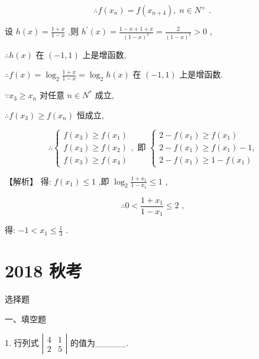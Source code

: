 \documentclass[10pt]{article}
\begin{document}
\[
\therefore f\left( {x}_{n}\right)  = f\left( {x}_{n + 4}\right) ,\;n \in  {N}^{ + }\text{ . }
\]

设 \(h\left( x\right)  = \frac{1 + x}{1 - x}\) ,则 \({h}^{\prime }\left( x\right)  = \frac{1 - x + 1 + x}{{\left( 1 - x\right) }^{2}} = \frac{2}{{\left( 1 - x\right) }^{2}} > 0\) ,

\(\therefore h\left( x\right)\) 在 \(\left( {-1,1}\right)\) 上是增函数,

\(\therefore f\left( x\right)  = {\log }_{2}\frac{1 + x}{1 - x} = {\log }_{2}h\left( x\right)\) 在 \(\left( {-1,1}\right)\) 上是增函数.

\(\because {x}_{3} \geq  {x}_{n}\) 对任意 \(n \in  {N}^{ * }\) 成立,

\(\therefore f\left( {x}_{3}\right)  \geq  f\left( {x}_{n}\right)\) 恒成立,

\[
\therefore \left\{  {\begin{array}{l} f\left( {x}_{3}\right)  \geq  f\left( {x}_{1}\right) \\  f\left( {x}_{3}\right)  \geq  f\left( {x}_{2}\right) \\  f\left( {x}_{3}\right)  \geq  f\left( {x}_{4}\right)  \end{array},\text{ 即 }\left\{  \begin{array}{l} 2 - f\left( {x}_{1}\right)  \geq  f\left( {x}_{1}\right) \\  2 - f\left( {x}_{1}\right)  \geq  f\left( {x}_{1}\right)  - 1, \\  2 - f\left( {x}_{1}\right)  \geq  1 - f\left( {x}_{1}\right)  \end{array}\right. }\right.
\]

【解析】 得: \(f\left( {x}_{1}\right)  \leq  1\) ,即 \({\log }_{2}\frac{1 + {x}_{1}}{1 - {x}_{1}} \leq  1\) ,

\[
\therefore 0 < \frac{1 + {x}_{1}}{1 - {x}_{1}} \leq  2\text{ , }
\]

得: \(- 1 < {x}_{1} \leq  \frac{1}{3}\) .

\section*{2018 秋考}

选择题

一、填空题

1. 行列式 \(\left| \begin{array}{ll} 4 & 1 \\  2 & 5 \end{array}\right|\) 的值为\_\_\_\_\_.
\end{document}
